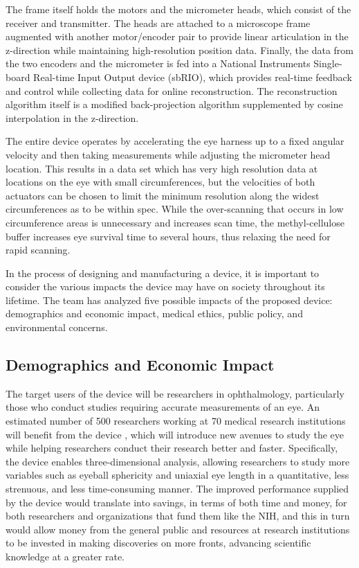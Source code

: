 \documentclass{article}
\begin{document}
The frame itself holds the motors and the micrometer heads, which
consist of the receiver and transmitter. The heads are attached to a
microscope frame augmented with another motor/encoder pair to provide
linear articulation in the z-direction while maintaining
high-resolution position data. Finally, the data from the two encoders
and the micrometer is fed into a National Instruments Single-board
Real-time Input Output device (sbRIO), which provides real-time
feedback and control while collecting data for online
reconstruction. The reconstruction algorithm itself is a modified
back-projection algorithm supplemented by cosine interpolation in the
z-direction.
 
The entire device operates by accelerating the eye harness up to a
fixed angular velocity and then taking measurements while adjusting
the micrometer head location. This results in a data set which has
very high resolution data at locations on the eye with small
circumferences, but the velocities of both actuators can be chosen to
limit the minimum resolution along the widest circumferences as to be
within spec. While the over-scanning that occurs in low circumference
areas is unnecessary and increases scan time, the methyl-cellulose
buffer increases eye survival time to several hours, thus relaxing the
need for rapid scanning.
 
In the process of designing and manufacturing a device, it is
important to consider the various impacts the device may have on
society throughout its lifetime. The team has analyzed five possible
impacts of the proposed device: demographics and economic impact,
medical ethics, public policy, and environmental concerns.
 
 
\subsection{Demographics and Economic Impact}
\label{sec:Demographics}
 
The target users of the device will be researchers in ophthalmology,
particularly those who conduct studies requiring accurate measurements
of an eye. An estimated number of 500 researchers working at 70
medical research institutions will benefit from the device
\cite{Nickerson}, which will introduce new avenues to study the
eye while helping researchers conduct their research better and
faster. Specifically, the device enables three-dimensional analysis,
allowing researchers to study more variables such as eyeball
sphericity and uniaxial eye length in a quantitative, less strenuous,
and less time-consuming manner. The improved performance supplied by the
device would translate into savings, in terms of both time and money,
for both researchers and organizations that fund them like the
NIH, and this in turn would allow money from the general public and
resources at research institutions to be invested in making
discoveries on more fronts, advancing scientific knowledge at a
greater rate.
 
\end{document}
